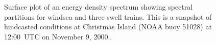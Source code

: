 \begin{figure} \begin{center}
\caption{Surface plot of an energy density spectrum showing spectral
         partitions for windsea and three swell trains.  This is a snapshot of
         hindcasted conditions at Christmas Island (NOAA buoy 51028) at
         12:00~UTC on November 9, 2000..}
         \label{fig:partitions} \botline
\end{center}
\end{figure}





